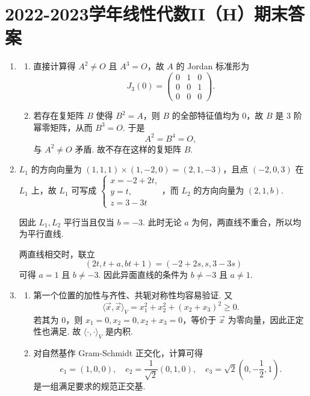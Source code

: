 \section{2022-2023学年线性代数II（H）期末答案}

\begin{enumerate}
    \item
    \begin{enumerate}
        \item 直接计算得 $A^2\neq O$ 且 $A^3=O$，故 $A$ 的 Jordan 标准形为
        \[
            J_3(0)=\begin{pmatrix}0&1&0\\0&0&1\\0&0&0\end{pmatrix}.
        \]

        \item 若存在复矩阵 $B$ 使得 $B^2=A$，则 $B$ 的全部特征值均为 $0$，故 $B$ 是 $3$ 阶幂零矩阵，从而 $B^3=O$. 于是
        \[
            A^2=B^4=O,
        \]
        与 $A^2\neq O$ 矛盾. 故不存在这样的复矩阵 $B$.
    \end{enumerate}

    \item $L_1$ 的方向向量为 $(1,1,1) \times (1,-2,0) = (2,1,-3)$，且点 $(-2,0,3)$ 在 $L_1$ 上，故 $L_1$ 可写成 $\begin{cases}
        x = -2+2t,\\
        y = t,\\
        z = 3-3t
    \end{cases}$，而 $L_2$ 的方向向量为 $(2,1,b)$.

    因此 $L_1,L_2$ 平行当且仅当 $b=-3$. 此时无论 $a$ 为何，两直线不重合，所以均为平行直线.

    两直线相交时，联立
    \[
        (2t,t+a,bt+1)=(-2+2s,s,3-3s)
    \]
    可得 $a=1$ 且 $b\neq -3$. 因此异面直线的条件为 $b\neq -3$ 且 $a\neq 1$.

    \item
    \begin{enumerate}
        \item 第一个位置的加性与齐性、共轭对称性均容易验证. 又
        \[
            \langle \vec{x}, \vec{x}\rangle_V=x_1^2+x_2^2+(x_2+x_3)^2 \geqslant 0.
        \]
        若其为 $0$，则 $x_1=0,x_2=0,x_2+x_3=0$，等价于 $\vec{x}$ 为零向量，因此正定性也满足. 故 $\langle \cdot, \cdot \rangle_V$ 是内积.

        \item 对自然基作 Gram-Schmidt 正交化，计算可得
        \[
            e_1=(1,0,0),\quad e_2=\frac{1}{\sqrt{2}}(0,1,0),\quad e_3=\sqrt{2}\left(0,-\frac12,1\right).
        \]
        是一组满足要求的规范正交基.


\end{enumerate}
\end{enumerate}

